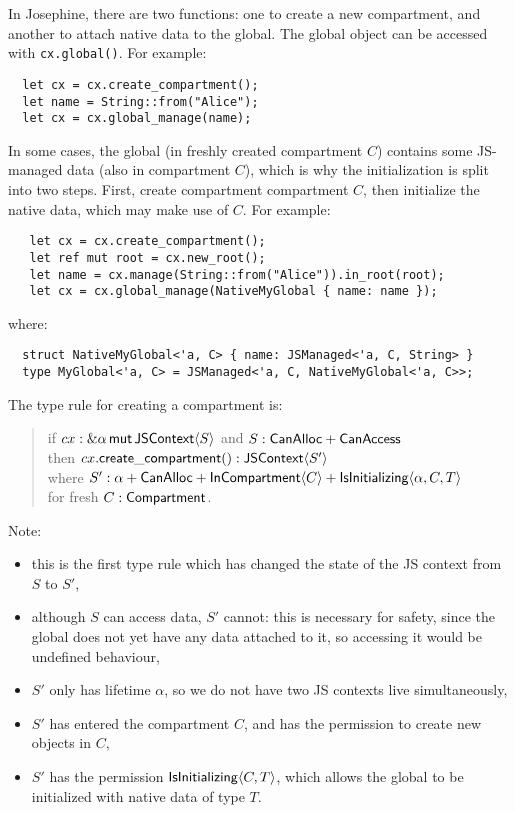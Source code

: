 In Josephine, there are two functions: one to create a new compartment,
and another to attach native data to the global. The global object can
be accessed with \verb|cx.global()|. For example:
\begin{verbatim}
  let cx = cx.create_compartment();
  let name = String::from("Alice");
  let cx = cx.global_manage(name);
\end{verbatim}
In some cases, the global (in freshly created compartment $C$)
contains some JS-managed data (also in compartment $C$), which is why
the initialization is split into two steps. First, create compartment
compartment $C$, then initialize the native data, which may make
use of $C$. For example:
\begin{verbatim}
   let cx = cx.create_compartment();
   let ref mut root = cx.new_root();
   let name = cx.manage(String::from("Alice")).in_root(root);
   let cx = cx.global_manage(NativeMyGlobal { name: name });
\end{verbatim}
where:
\begin{verbatim}
  struct NativeMyGlobal<'a, C> { name: JSManaged<'a, C, String> }
  type MyGlobal<'a, C> = JSManaged<'a, C, NativeMyGlobal<'a, C>>;
\end{verbatim}
The type rule for creating a compartment is:
\begin{quote}
  if $cx:\&\alpha\,\mathsf{mut}\,{\mathsf{JSContext}\langle S\rangle}$
  and $S: \mathsf{CanAlloc} + \mathsf{CanAccess}$ \\
  then $cx.\mathsf{create\_compartment}() : \mathsf{JSContext}\langle S'\rangle$ \\\mbox{}\quad
  where $S': \alpha + \mathsf{CanAlloc} + \mathsf{InCompartment}\langle C\rangle + \mathsf{IsInitializing}\langle \alpha,C,T\rangle$ \\\mbox{}\qquad
  for fresh $C: \mathsf{Compartment}$.
\end{quote}
Note:
\begin{itemize}

\item this is the first type rule which has changed the state of
  the JS context from $S$ to $S'$,

\item although $S$ can access data, $S'$ cannot: this is necessary for
  safety, since the global does not yet have any data attached to it,
  so accessing it would be undefined behaviour,

\item $S'$ only has lifetime $\alpha$, so we do not have two JS contexts
  live simultaneously,

\item $S'$ has entered the compartment $C$, and has the permission to create
  new objects in $C$,
  
\item $S'$ has the permission $\mathsf{IsInitializing}\langle C,T\rangle$, which allows the global
  to be initialized with native data of type $T$.
  
\end{itemize}
